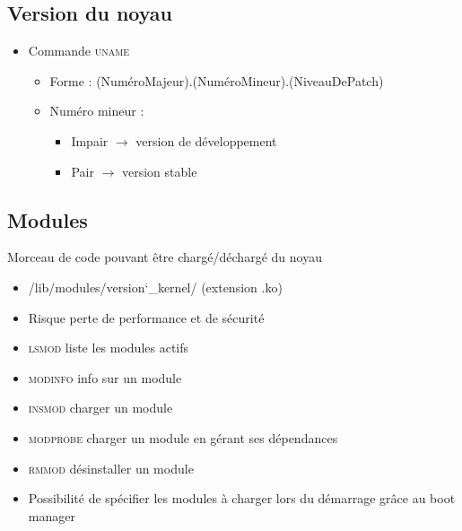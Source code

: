 \documentclass[a4paper]{article}
\begin{document}
      \subsection{Version du noyau}
      \begin{itemize}[label = \textbullet, font = \Large]
        \item Commande \textsc{uname}
        \begin{itemize}[label=, font=\scriptsize] 
          \item Forme : (NuméroMajeur).(NuméroMineur).(NiveauDePatch)
          \item Numéro mineur :
          \begin{itemize}
            \item Impair $\rightarrow$ version de développement
            \item Pair $\rightarrow$ version stable
          \end{itemize}
        \end{itemize}
      \end{itemize}

      \subsection{Modules}
      Morceau de code pouvant être chargé/déchargé du noyau
      \begin{itemize}[label = \textbullet, font = \Large]
        \item /lib/modules/version\char`_kernel/ (extension .ko)
        \item Risque perte de performance et de sécurité
        \item \textsc{lsmod} liste les modules actifs
        \item \textsc{modinfo} info sur un module
        \item \textsc{insmod} charger un module
        \item \textsc{modprobe} charger un module en gérant ses dépendances
        \item \textsc{rmmod} désinstaller un module
        \item Possibilité de spécifier les modules à charger lors du démarrage grâce au boot manager
      \end{itemize}
\end{document}
